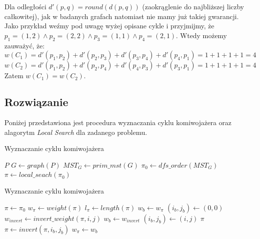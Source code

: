 \documentclass[12pt]{article}
\begin{document}
    \newpage

    \noindent Dla odległości $d'(p, q) = round(d(p, q))$ (zaokrąglenie do najbliższej liczby
    całkowitej), jak w badanych grafach natomiast nie mamy już takiej gwarancji. Jako przykład
    weźmy pod uwagę wyżej opisane cykle i przyjmijmy, że
    $p_1 = (1,2) \land p_2 = (2,2) \land p_3 = (1,1) \land p_4 = (2,1)$.
    \newline
    Wtedy możemy zauważyć, że:
    $$w(C_1) = d'(p_1,p_2) + d'(p_2,p_3) + d'(p_3,p_4) + d'(p_4,p_1) = 1 + 1 + 1 + 1 = 4$$
    $$w(C_2) = d'(p_1,p_2) + d'(p_2,p_4) + d'(p_4,p_3) + d'(p_3,p_1) = 1 + 1 + 1 + 1 = 4$$
    Zatem $w(C_1) = w(C_2)$.
    \newline

\subsection*{Rozwiązanie}

    Poniżej przedstawiona jest procedura wyznaczania cyklu komiwojażera oraz
    alagorytm \textit{Local Search} dla zadanego problemu.

    \begin{algorithm}
    \caption{Wyznaczanie cyklu komiwojażera}\label{alg:tsp_cycle}
    \begin{algorithmic}[1]
        \Require $P$
        \State $G \gets graph(P)$
        \State $MST_G \gets prim\_mst(G)$
        \State $\pi_0 \gets dfs\_order(MST_G)$
        \State $\pi \gets local\_seach(\pi_0)$
    \end{algorithmic}
    \end{algorithm}

    \begin{algorithm}[h!]
    \caption{Wyznaczanie cyklu komiwojażera}\label{alg:local_search}
    \begin{algorithmic}[1]
            \State $\pi \gets \pi_0$
            \State $w_\pi \gets weight(\pi)$
            \State $l_\pi \gets length(\pi)$
            \State
                \State $w_b \gets w_\pi$
                \State $(i_b, j_b) \gets (0, 0)$
                        \State $w_{invert} \gets invert\_weight(\pi, i, j)$
                            \State $w_b \gets w_{invert}$
                            \State $(i_b, j_b) \gets (i, j)$
                        \EndIf
                    \EndFor
                \EndFor
                \State
                    \Return $\pi$
                \EndIf
                \State
                \State $\pi \gets invert(\pi, i_b, j_b)$
                \State $w_\pi \gets w_b$
            \EndWhile
        \EndProcedure
    \end{algorithmic}
    \end{algorithm}
\end{document}
